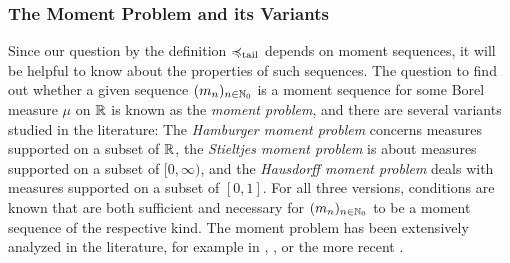 \documentclass[a4paper]{scrreprt}
\theoremstyle{definition}
\newtheorem{defn}[thm]{Definition} %
\begin{document}
    \subsubsection{The Moment Problem and its Variants}
    Since our question by the definition $\preccurlyeq_{\text{tail}}$ depends on moment sequences, it will be helpful to know about the properties of such sequences.
    The question to find out whether a given sequence $(m_n)_{n \in \mathbb{N}_0}$ is a moment sequence for some Borel measure $\mu$ on $\mathbb{R}$ is known as the \emph{moment problem}, and there are several variants studied in the literature:
    The \emph{Hamburger moment problem} concerns measures supported on a subset of $\mathbb{R}$, the \emph{Stieltjes moment problem} is about measures supported on a subset of $[0, \infty)$,
    and the \emph{Hausdorff moment problem} deals with measures supported on a subset of $[0, 1]$. For all three versions, conditions are known that are both sufficient and necessary for $(m_n)_{n \in \mathbb{N}_0}$ to be a moment sequence of the respective kind.
    The moment problem has been extensively analyzed in the literature, for example in \cite{bib:shohatTheProblemOfMoments}, \cite{bib:akhiezerClassicalMomentProblem}, or the more recent \cite{bib:schmuedgenTheMomentProblem}.
%    
\end{document}
